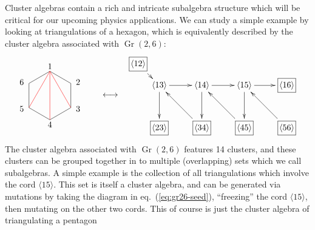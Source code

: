 \documentclass[11pt]{article}
\DeclareMathOperator{\Gr}{Gr}
\def\ket#1{\langle #1 \rangle}
\begin{document}
Cluster algebras contain a rich and intricate subalgebra structure which will be critical for our upcoming physics applications. We can study a simple example by looking at triangulations of a hexagon, which is equivalently described by the cluster algebra associated with $\Gr(2,6)$:
\begin{equation}\label{eq:gr26-seed}
\begin{gathered}
\begin{tikzpicture}
	\coordinate (P1) at (90:1);
	\coordinate (P2) at (30:1);
	\coordinate (P3) at (330:1);
	\coordinate (P4) at (270:1);
	\coordinate (P5) at (210:1);
	\coordinate (P6) at (150:1);
	\draw (P1) -- (P2) -- (P3) -- (P4) -- (P5) -- (P6) -- cycle;
  	\draw[color=red] (P1) -- (P3);
  	\draw[color=red] (P1) -- (P4);
  	\draw[color=red] (P1) -- (P5);
	\draw (0,1.2) node {1};
	\draw (30:1.1) node[anchor=west] {2};
	\draw (330:1.1) node[anchor=west] {3};
	\draw (270:1.2) node {4};
	\draw (210:1.1) node[anchor=east] {5};
	\draw (150:1.1) node[anchor=east] {6};
	\draw (2.5,0) node {$\longleftrightarrow$};
	\draw (3,0) node {\phantom{.}};
\end{tikzpicture} 
\begin{xy} 0;<1pt,0pt>:<0pt,-1pt>::
	(-50,-50) *+{\langle 13\rangle} ="13",
	(0,-50) *+{\langle 14\rangle} ="14",
	(50,-50) *+{\langle 15\rangle} ="15",
	(100,-50) *+{\framebox[5ex]{$\langle 16\rangle$}} ="16",
	(100,0) *+{\framebox[5ex]{$\langle 56\rangle$}} ="56",
	(50,0) *+{\framebox[5ex]{$\langle 45\rangle$}} ="45",
	(0,0) *+{\framebox[5ex]{$\langle 34\rangle$}} ="34",
	(-50,0) *+{\framebox[5ex]{$\langle 23\rangle$}} ="23",
	(-75,-75) *+{\framebox[5ex]{$\langle 12\rangle$}} ="12",
	(70,0) *+{},
	"12", {\ar"13"},
	"13", {\ar"14"},
	"13", {\ar"23"},
	"34", {\ar"13"},
	"14", {\ar"15"},
	"14", {\ar"34"},
	"45", {\ar"14"},
	"15", {\ar"45"},
	"56", {\ar"15"},
	"15", {\ar"16"},
\end{xy}
\end{gathered}
\end{equation}
The cluster algebra associated with $\Gr(2,6)$ features 14 clusters, and these clusters can be grouped together in to multiple (overlapping) sets which we call subalgebras. A simple example is the collection of all triangulations which involve the cord $\ket{15}$. This set is itself a cluster algebra, and can be generated via mutations by taking the diagram in eq.~(\ref{eq:gr26-seed}), ``freezing'' the cord $\ket{15}$, then mutating on the other two cords. This of course is just the cluster algebra of triangulating a pentagon
\end{document}
